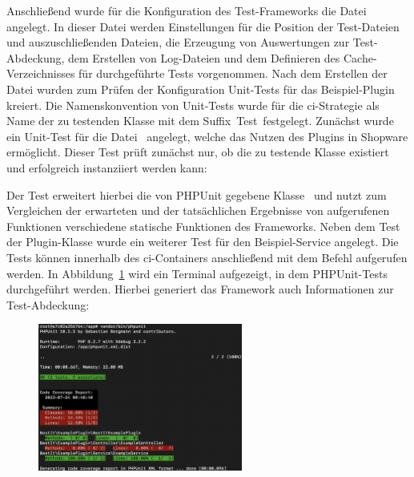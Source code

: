
Anschließend wurde für die Konfiguration des Test-Frameworks die Datei\  angelegt.
In dieser Datei werden Einstellungen für die Position der Test-Dateien und auszuschließenden Dateien, die
Erzeugung von Auswertungen zur Test-Abdeckung, dem Erstellen von Log-Dateien und dem Definieren des Cache-Verzeichnisses
für durchgeführte Tests vorgenommen.
Nach dem Erstellen der Datei wurden zum Prüfen der Konfiguration Unit-Tests für das Beispiel-Plugin kreiert.
Die Namenskonvention von Unit-Tests wurde für die \acrshort{ci}-Strategie als Name der zu testenden Klasse mit dem
Suffix\ \glqq Test\grqq\ festgelegt.
Zunächst wurde ein Unit-Test für die Datei\  angelegt, welche das Nutzen des
Plugins in Shopware ermöglicht.
Dieser Test prüft zunächst nur, ob die zu testende Klasse existiert und erfolgreich instanziiert werden kann:



Der Test erweitert hierbei die von PHPUnit gegebene Klasse\  und nutzt zum Vergleichen der
erwarteten und der tatsächlichen Ergebnisse von aufgerufenen Funktionen verschiedene statische Funktionen des
Frameworks.
Neben dem Test der Plugin-Klasse wurde ein weiterer Test für den Beispiel-Service angelegt.
Die Tests können innerhalb des \acrshort{ci}-Containers anschließend mit dem Befehl
 aufgerufen werden.
In Abbildung\ \ref{fig:phpunit-results} wird ein Terminal aufgezeigt, in dem PHPUnit-Tests durchgeführt werden.
Hierbei generiert das Framework auch Informationen zur Test-Abdeckung:

\begin{figure}[H]
    \centering
    \includegraphics[width=0.6\textwidth]{images/content/phpunit-result}
    \label{fig:phpunit-results}
\end{figure}

